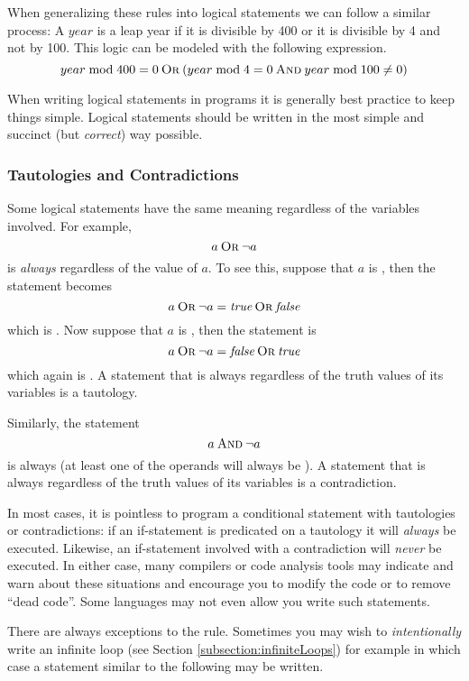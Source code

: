 When generalizing these rules into logical statements we can follow a similar process:
A $year$ is a leap year if it is divisible by 400 or it is divisible by 4 and not by 100.  
This logic can be modeled with the following expression.
  $$year \bmod{400} = 0 \mathbin{\textsc{Or}} ( year \bmod{4} = 0 \mathbin{\textsc{And}} year \bmod{100} \neq 0)$$

When writing logical statements in programs it is generally best practice to 
keep things simple.  Logical statements should be written in the most simple and
succinct (but \emph{correct}) way possible.  

\subsubsection{Tautologies and Contradictions}

Some logical statements have the same meaning regardless of the
variables involved.  For example, 
  $$a \mathbin{\textsc{Or}} \neg a$$
is \emph{always} \True regardless of the value of $a$.  To see this, suppose that
$a$ is \True, then the statement becomes
  $$a \mathbin{\textsc{Or}} \neg a = \emph{true} \mathbin{\textsc{Or}} \emph{false}$$
which is \True.  Now suppose that $a$ is \False, then the statement is 
  $$a \mathbin{\textsc{Or}} \neg a = \emph{false} \mathbin{\textsc{Or}} \emph{true}$$
which again is \True.  A statement that is always \True regardless of the truth
values of its variables is a \gls{tautology}.

Similarly, the statement
  $$a \mathbin{\textsc{And}} \neg a$$
is always \False (at least one of the operands will always be \False).  A
statement that is always \False regardless of the truth values of its variables
is a \gls{contradiction}.

In most cases, it is pointless to program a conditional statement with 
tautologies or contradictions: if an if-statement is predicated on a tautology
it will \emph{always} be executed.  Likewise, an if-statement involved with 
a contradiction will \emph{never} be executed.  In either case, many compilers
or code analysis tools may indicate and warn about these situations and 
encourage you to modify the code or to remove ``\gls{dead code}''.  Some
languages may not even allow you write such statements.

There are always exceptions to the rule.  Sometimes you may wish to 
\emph{intentionally} write an infinite loop (see Section \ref{subsection:infiniteLoops}) 
for example in which case a statement similar to the following may be written.

\begin{algorithm}[H]
\end{algorithm}

